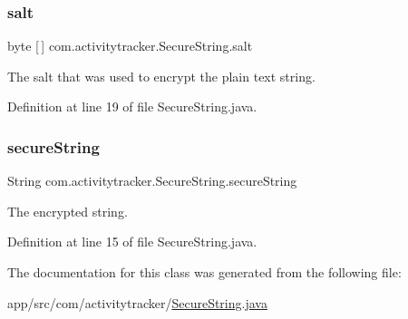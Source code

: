 \subsubsection{\texorpdfstring{salt}{salt}}
{\footnotesize\ttfamily byte \mbox{[}$\,$\mbox{]} com.\+activitytracker.\+Secure\+String.\+salt\hspace{0.3cm}{\ttfamily [private]}}

The salt that was used to encrypt the plain text string. 

Definition at line 19 of file Secure\+String.\+java.

\mbox{\label{classcom_1_1activitytracker_1_1_secure_string_a1448f7b8865c6c57cc7218662ee7f1ee}} 
\subsubsection{\texorpdfstring{secureString}{secureString}}
{\footnotesize\ttfamily String com.\+activitytracker.\+Secure\+String.\+secure\+String\hspace{0.3cm}{\ttfamily [private]}}

The encrypted string. 

Definition at line 15 of file Secure\+String.\+java.



The documentation for this class was generated from the following file\+:\begin{DoxyCompactItemize}
\item 
app/src/com/activitytracker/\mbox{\hyperlink{_secure_string_8java}{Secure\+String.\+java}}\end{DoxyCompactItemize}
